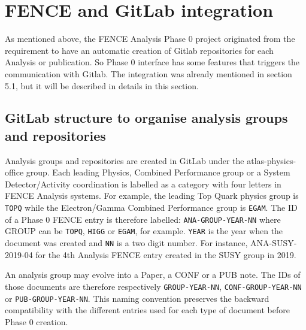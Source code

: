 
\section{FENCE and GitLab integration}%
\label{sec:FENCE_and_Gitlab_integration}

As mentioned above, the FENCE Analysis Phase 0 project originated from the requirement to have an automatic creation of Gitlab repositories for each Analysis or publication. So Phase 0 interface has some features that triggers the communication with Gitlab. The integration was already mentioned in section 5.1, but it will be described in details in this section.

\subsection{GitLab structure to organise analysis groups and repositories}%
\label{sec:Gitlab_structure_to_organise_Analysis_groups_and_repositories}

Analysis groups and repositories are created in GitLab under the atlas-physics-office group. Each leading Physics, Combined Performance group or a System Detector/Activity coordination is labelled as a category with four letters in FENCE Analysis systems.
For example, the leading Top Quark physics group is \texttt{TOPQ} while the Electron/Gamma Combined Performance group is \texttt{EGAM}.
The ID of a Phase 0 FENCE entry is therefore labelled: \texttt{ANA-GROUP-YEAR-NN} where GROUP can be \texttt{TOPQ}, \texttt{HIGG} or \texttt{EGAM}, for example.
\texttt{YEAR} is the year when the document was created and \texttt{NN} is a two digit number.
For instance, ANA-SUSY-2019-04 for the 4th Analysis FENCE entry created in the SUSY group in 2019.
                    
An analysis group may evolve into a Paper, a CONF or a PUB note. The IDs of those documents are therefore respectively \texttt{GROUP-YEAR-NN}, \texttt{CONF-GROUP-YEAR-NN} or \texttt{PUB-GROUP-YEAR-NN}.
This naming convention preserves the backward compatibility with the different entries used for each type of document before Phase 0 creation.

